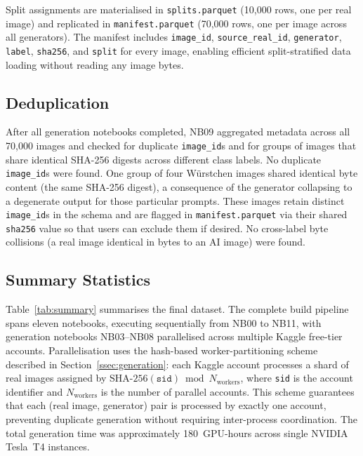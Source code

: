 Split assignments are materialised in \texttt{splits.parquet}
(10,000 rows, one per real image) and replicated in
\texttt{manifest.parquet} (70,000 rows, one per image across all
generators).
The manifest includes \texttt{image\_id}, \texttt{source\_real\_id},
\texttt{generator}, \texttt{label}, \texttt{sha256}, and \texttt{split}
for every image, enabling efficient split-stratified data loading
without reading any image bytes.

\subsection{Deduplication}
\label{ssec:dedup}

After all generation notebooks completed, NB09 aggregated metadata
across all 70,000 images and checked for duplicate \texttt{image\_id}s
and for groups of images that share identical SHA-256 digests across
different class labels.
No duplicate \texttt{image\_id}s were found.
One group of four W\"{u}rstchen images shared identical byte content
(the same SHA-256 digest), a consequence of the generator collapsing
to a degenerate output for those particular prompts.
These images retain distinct \texttt{image\_id}s in the schema and
are flagged in \texttt{manifest.parquet} via their shared
\texttt{sha256} value so that users can exclude them if desired.
No cross-label byte collisions (a real image identical in bytes to an
AI image) were found.

\subsection{Summary Statistics}
\label{ssec:summary}

Table~\ref{tab:summary} summarises the final dataset.
The complete build pipeline spans eleven notebooks, executing
sequentially from NB00 to NB11, with generation notebooks NB03--NB08
parallelised across multiple Kaggle free-tier accounts.
Parallelisation uses the hash-based worker-partitioning scheme
described in Section~\ref{ssec:generation}: each Kaggle account
processes a shard of real images assigned by
$\mathrm{SHA}\text{-}256(\texttt{sid}) \bmod N_{\text{workers}}$,
where \texttt{sid} is the account identifier and $N_{\text{workers}}$
is the number of parallel accounts.
This scheme guarantees that each (real image, generator) pair is
processed by exactly one account, preventing duplicate generation
without requiring inter-process coordination.
The total generation time was approximately 180~GPU-hours across
single NVIDIA Tesla~T4 instances.

